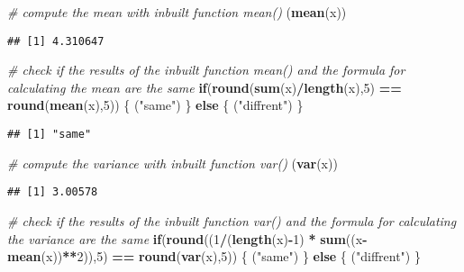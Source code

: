 \documentclass[
]{article}
\newenvironment{Shaded}{\begin{snugshade}}{\end{snugshade}}
\newcommand{\CommentTok}[1]{\textcolor[rgb]{0.56,0.35,0.01}{\textit{#1}}}
\newcommand{\ControlFlowTok}[1]{\textcolor[rgb]{0.13,0.29,0.53}{\textbf{#1}}}
\newcommand{\DecValTok}[1]{\textcolor[rgb]{0.00,0.00,0.81}{#1}}
\newcommand{\KeywordTok}[1]{\textcolor[rgb]{0.13,0.29,0.53}{\textbf{#1}}}
\newcommand{\NormalTok}[1]{#1}
\newcommand{\OperatorTok}[1]{\textcolor[rgb]{0.81,0.36,0.00}{\textbf{#1}}}
\newcommand{\StringTok}[1]{\textcolor[rgb]{0.31,0.60,0.02}{#1}}
\begin{document}
\begin{Shaded}
\begin{Highlighting}[]
\CommentTok{# compute the mean with inbuilt function mean()}
\NormalTok{(}\KeywordTok{mean}\NormalTok{(x))}
\end{Highlighting}
\end{Shaded}

\begin{verbatim}
## [1] 4.310647
\end{verbatim}

\begin{Shaded}
\begin{Highlighting}[]
\CommentTok{# check if the results of the inbuilt function mean() and the formula for calculating the mean are the same }
\ControlFlowTok{if}\NormalTok{(}\KeywordTok{round}\NormalTok{(}\KeywordTok{sum}\NormalTok{(x)}\OperatorTok{/}\KeywordTok{length}\NormalTok{(x),}\DecValTok{5}\NormalTok{) }\OperatorTok{==}\StringTok{ }\KeywordTok{round}\NormalTok{(}\KeywordTok{mean}\NormalTok{(x),}\DecValTok{5}\NormalTok{)) \{}
\NormalTok{  (}\StringTok{"same"}\NormalTok{)}
\NormalTok{\} }\ControlFlowTok{else}\NormalTok{ \{}
\NormalTok{  (}\StringTok{"diffrent"}\NormalTok{)}
\NormalTok{\}  }
\end{Highlighting}
\end{Shaded}

\begin{verbatim}
## [1] "same"
\end{verbatim}

\begin{Shaded}
\begin{Highlighting}[]
\CommentTok{# compute the variance with inbuilt function var()}
\NormalTok{(}\KeywordTok{var}\NormalTok{(x))}
\end{Highlighting}
\end{Shaded}

\begin{verbatim}
## [1] 3.00578
\end{verbatim}

\begin{Shaded}
\begin{Highlighting}[]
\CommentTok{# check if the results of the inbuilt function var() and the formula for calculating the variance are the same }
\ControlFlowTok{if}\NormalTok{(}\KeywordTok{round}\NormalTok{((}\DecValTok{1}\OperatorTok{/}\NormalTok{(}\KeywordTok{length}\NormalTok{(x)}\OperatorTok{-}\DecValTok{1}\NormalTok{) }\OperatorTok{*}\StringTok{ }\KeywordTok{sum}\NormalTok{((x}\OperatorTok{-}\KeywordTok{mean}\NormalTok{(x))}\OperatorTok{**}\DecValTok{2}\NormalTok{)),}\DecValTok{5}\NormalTok{) }\OperatorTok{==}\StringTok{ }\KeywordTok{round}\NormalTok{(}\KeywordTok{var}\NormalTok{(x),}\DecValTok{5}\NormalTok{)) \{}
\NormalTok{  (}\StringTok{"same"}\NormalTok{)}
\NormalTok{\} }\ControlFlowTok{else}\NormalTok{ \{}
\NormalTok{  (}\StringTok{"diffrent"}\NormalTok{)}
\NormalTok{\}}
\end{Highlighting}
\end{Shaded}
\end{document}

